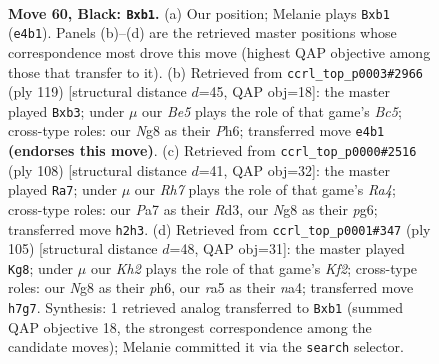 \documentclass[11pt]{article}
\begin{document}
\clearpage

\begin{figure}[p]\centering
\begin{subfigure}{0.46\textwidth}\centering
\resizebox{\linewidth}{!}{%
\newchessgame
\chessboard[
  setfen={6n1/p6k/P6p/Rp3p2/1P2bP1b/1R6/7r/1N3K2 b - - 11 60},
  showmover=false,
  pgfstyle=straightmove, color=movearrow, markmove={e4-b1}
]}
\caption{}
\end{subfigure}\hfill
\begin{subfigure}{0.46\textwidth}\centering
\resizebox{\linewidth}{!}{%
\newchessgame
\chessboard[
  setfen={1R6/5p1k/2P2p1p/3p4/2b1rP2/1N5P/5KP1/8 b - - 0 60},
  showmover=false,
  pgfstyle=straightmove, color=movearrow, markmove={c4-b3}
]}
\caption{}
\end{subfigure}
\\[4pt]
\begin{subfigure}{0.46\textwidth}\centering
\resizebox{\linewidth}{!}{%
\newchessgame
\chessboard[
  setfen={7k/1pr2b2/6pp/1rP5/R6P/3R1B2/6PK/8 w - - 1 55},
  showmover=false,
  pgfstyle=straightmove, color=movearrow, markmove={a4-a7}
]}
\caption{}
\end{subfigure}\hfill
\begin{subfigure}{0.46\textwidth}\centering
\resizebox{\linewidth}{!}{%
\newchessgame
\chessboard[
  setfen={8/5k2/4p2P/2ppP3/N1b5/Pp6/1P1K3R/1r6 b - - 0 53},
  showmover=false,
  pgfstyle=straightmove, color=movearrow, markmove={f7-g8}
]}
\caption{}
\end{subfigure}
\caption{\textbf{Move 60, Black: \texttt{Bxb1}.} (a) Our position; Melanie plays \texttt{Bxb1} (\texttt{e4b1}). Panels (b)--(d) are the retrieved master positions whose correspondence most drove this move (highest QAP objective among those that transfer to it). (b) Retrieved from \texttt{ccrl\_top\_p0003\#2966} (ply 119) [structural distance $d$=45, QAP obj=18]: the master played \texttt{Bxb3}; under $\mu$ our \emph{Be5} plays the role of that game's \emph{Bc5}; cross-type roles: our \emph{N}g8 as their \emph{P}h6; transferred move \texttt{e4b1} \textbf{(endorses this move)}. (c) Retrieved from \texttt{ccrl\_top\_p0000\#2516} (ply 108) [structural distance $d$=41, QAP obj=32]: the master played \texttt{Ra7}; under $\mu$ our \emph{Rh7} plays the role of that game's \emph{Ra4}; cross-type roles: our \emph{P}a7 as their \emph{R}d3, our \emph{N}g8 as their \emph{p}g6; transferred move \texttt{h2h3}. (d) Retrieved from \texttt{ccrl\_top\_p0001\#347} (ply 105) [structural distance $d$=48, QAP obj=31]: the master played \texttt{Kg8}; under $\mu$ our \emph{Kh2} plays the role of that game's \emph{Kf2}; cross-type roles: our \emph{N}g8 as their \emph{p}h6, our \emph{r}a5 as their \emph{n}a4; transferred move \texttt{h7g7}. Synthesis: 1 retrieved analog transferred to \texttt{Bxb1} (summed QAP objective 18, the strongest correspondence among the candidate moves); Melanie committed it via the \texttt{search} selector.}
\label{fig:thought-m119}
\end{figure}
\end{document}
